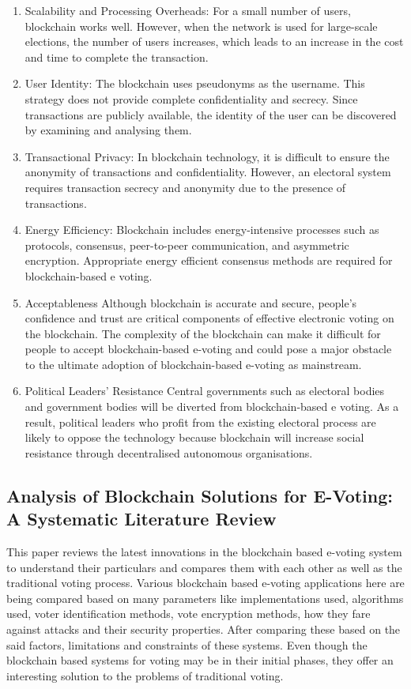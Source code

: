 \documentclass{IEEEtran}
\begin{document}
      \begin{enumerate}
        \item Scalability and Processing Overheads: For a small number of users, blockchain works well. However, when the network is used for large-scale elections, the number of users increases, which leads to an increase in the cost and time to complete the transaction.
        \item User Identity: The blockchain uses pseudonyms as the username. This strategy does not provide complete confidentiality and secrecy. Since transactions are publicly available, the identity of the user can be discovered by examining and analysing them.
        \item Transactional Privacy: In blockchain technology, it is difficult to ensure the anonymity of transactions and confidentiality. However, an electoral system requires transaction secrecy and anonymity due to the presence of transactions.
        \item Energy Efficiency:  Blockchain includes energy-intensive processes such as protocols, consensus, peer-to-peer communication, and asymmetric encryption. Appropriate energy efficient consensus methods are required for blockchain-based e voting.
        \item Acceptableness Although blockchain is accurate and secure, people's confidence and trust are critical components of effective electronic voting on the blockchain. The complexity of the blockchain can make it difficult for people to accept blockchain-based e-voting and could pose a major obstacle to the ultimate adoption of blockchain-based e-voting as mainstream.
        \item Political Leaders’ Resistance Central governments such as electoral bodies and government bodies will be diverted from blockchain-based e voting. As a result, political leaders who profit from the existing electoral process are likely to oppose the technology because blockchain will increase social resistance through decentralised autonomous organisations.
      \end{enumerate}
    
    \subsection{Analysis of Blockchain Solutions for E-Voting: A Systematic Literature Review \cite{9812616}}
      This paper reviews the latest innovations in the  blockchain based e-voting system to understand their particulars and compares them with each other as well as the traditional voting process. Various blockchain based e-voting applications here are being compared based on many parameters like  implementations used, algorithms used, voter identification methods, vote encryption methods, how they fare against attacks and their security properties. After comparing these based on the said factors, limitations and constraints of these systems. Even though the blockchain based systems for voting may be in their initial phases, they offer an interesting solution to the problems of traditional voting.
\end{document}

